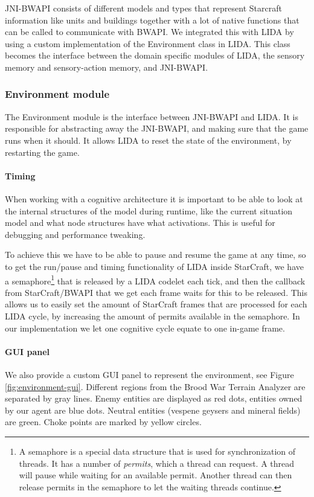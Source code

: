 JNI-BWAPI consists of different models and types that represent Starcraft information like units and buildings together with a lot of native functions that can be called to communicate with BWAPI. We integrated this with LIDA by using a custom implementation of the Environment class in LIDA. This class becomes the interface between the domain specific modules of LIDA, the sensory memory and sensory-action memory, and JNI-BWAPI.


\subsubsection{Environment module}
The Environment module is the interface between JNI-BWAPI and LIDA. It is responsible for abstracting away the JNI-BWAPI, and making sure that the game runs when it should. It allows LIDA to reset the state of the environment, by restarting the game.

\paragraph{Timing} When working with a cognitive architecture it is important to be able to look at the internal structures of the model during runtime, like the current situation model and what node structures have what activations. This is useful for debugging and performance tweaking.

To achieve this we have to be able to pause and resume the game at any time, so to get the run/pause and timing functionality of LIDA inside StarCraft, we have a semaphore\footnote{A semaphore is a special data structure that is used for synchronization of threads. It has a number of {\em permits}, which a thread can request. A thread will pause while waiting for an available permit. Another thread can then release permits in the semaphore to let the waiting threads continue.} that is released by a LIDA codelet each tick, and then the callback from StarCraft/BWAPI that we get each frame waits for this to be released. This allows us to easily set the amount of StarCraft frames that are processed for each LIDA cycle, by increasing the amount of permits available in the semaphore. In our implementation we let one cognitive cycle equate to one in-game frame.

\paragraph{GUI panel} We also provide a custom GUI panel to represent the environment, see Figure \ref{fig:environment-gui}. Different regions from the Brood War Terrain Analyzer are separated by gray lines. Enemy entities are displayed as red dots, entities owned by our agent are blue dots. Neutral entities (vespene geysers and mineral fields) are green. Choke points are marked by yellow circles.

